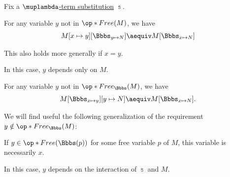 \begin{corollary}\label{thm:lambda_substitution_chain_contraction}
  Fix a \hyperref[def:atomic_lambda_term_substitution]{\( \muplambda \)-term substitution} \( \Bbbs \).

  \begin{thmenum}
     For any variable \( y \) not in \( \op*{Free}(M) \), we have
    \begin{equation}\label{eq:thm:lambda_substitution_chain_contraction/precomposition}
      M[x \mapsto y][\Bbbs_{y \mapsto N}]
      \aequiv
      M[\Bbbs_{x \mapsto N}]
    \end{equation}

    This also holds more generally if \( x = y \).

    In this case, \( y \) depends only on \( M \).

     For any variable \( y \) not in \( \op*{Free}_\Bbbs(M) \), we have
    \begin{equation}\label{eq:thm:lambda_substitution_chain_contraction/composition}
      M[\Bbbs_{x \mapsto y}][y \mapsto N]
      \aequiv
      M[\Bbbs_{x \mapsto N}].
    \end{equation}

    We will find useful the following generalization of the requirement \( y \notin \op*{Free}_\Bbbs(M) \):
    \begin{displayquote}
      If \( y \in \op*{Free}(\Bbbs(p)) \) for some free variable \( p \) of \( M \), this variable is necessarily \( x \).
    \end{displayquote}

    In this case, \( y \) depends on the interaction of \( \Bbbs \) and \( M \).
  \end{thmenum}
\end{corollary}
